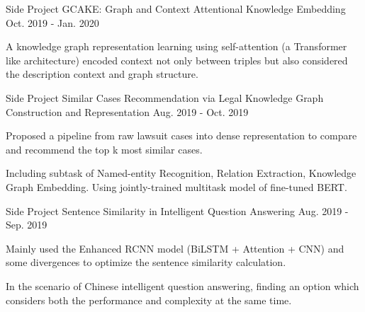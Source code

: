 

\begin{cventries}

  \cventry
    {Side Project} %
    {GCAKE: Graph and Context Attentional Knowledge Embedding} %
    {} %
    {Oct. 2019 - Jan. 2020} %
    {
      \begin{cvitems} %
        \item {A knowledge graph representation learning using self-attention (a Transformer like architecture) encoded context not only between triples but also considered the description context and graph structure.}
      \end{cvitems}
    }

  \cventry
    {Side Project} %
    {Similar Cases Recommendation via Legal Knowledge Graph Construction and Representation} %
    {} %
    {Aug. 2019 - Oct. 2019} %
    {
      \begin{cvitems} %
        \item {Proposed a pipeline from raw lawsuit cases into dense representation to compare and recommend the top k most similar cases.}
        \item {Including subtask of Named-entity Recognition, Relation Extraction, Knowledge Graph Embedding. Using jointly-trained multitask model of fine-tuned BERT.}
      \end{cvitems}
    }

  \cventry
    {Side Project} %
    {Sentence Similarity in Intelligent Question Answering} %
    {} %
    {Aug. 2019 - Sep. 2019} %
    {
      \begin{cvitems} %
        \item {Mainly used the Enhanced RCNN model (BiLSTM + Attention + CNN) and some divergences to optimize the sentence similarity calculation.}
        \item {In the scenario of Chinese intelligent question answering, finding an option which considers both the performance and complexity at the same time.}
      \end{cvitems}
    }


\end{cventries}
